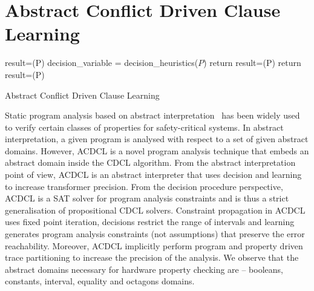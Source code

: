 \documentclass[a4paper,conference]{llncs}
\begin{document}
\section{Abstract Conflict Driven Clause Learning}
\begin{algorithm2e}[t]
\DontPrintSemicolon
{}
\begin{small}
\assign result=\deduce(P)\;
 {
  \return \safe \;
}
\uElse
{
   {
    \return \unsafe \;
  }
}
{
  \assign decision\_variable = decision\_heuristics($P$)\;
  {
    return \unknown\; 
  }
  \uElse
  {
    \assign result=\deduce(P)\;
    {
       {
        \return \unsafe \;
      }
      \uElse 
      {
        \continue\;
      }
    }
    \uElse
    {
       {
         {
          return \safe \;  
        }
        \assign result=\deduce(P)\;
      }
    }
  }
}
\end{small}
\caption{Abstract Conflict Driven Clause Learning\label{Alg:acdcl}}
\end{algorithm2e}
%
Static program analysis based on abstract
interpretation~\cite{DBLP:conf/emsoft/Cousot07} has been widely used to
verify certain classes of properties for safety-critical systems.  In
abstract interpretation, a given program is analysed with respect to a set
of given abstract domains.  However, ACDCL is a novel program analysis 
technique that embeds an abstract domain inside the CDCL algorithm.
From the abstract interpretation point of view, ACDCL is an abstract 
interpreter that uses decision and learning to increase transformer precision. 
From the decision procedure perspective, ACDCL is a SAT solver for program 
analysis constraints and is thus a strict generalisation of propositional CDCL solvers.
Constraint propagation in ACDCL uses fixed point iteration, decisions restrict the 
range of intervals and learning generates program analysis constraints (not assumptions) 
that preserve the error reachability.  Moreover, ACDCL implicitly 
perform program and property driven trace partitioning to increase the precision
of the analysis.  We observe that the abstract domains necessary for 
hardware property checking are -- booleans, constants, interval, equality 
and octagons domains.
\end{document}
